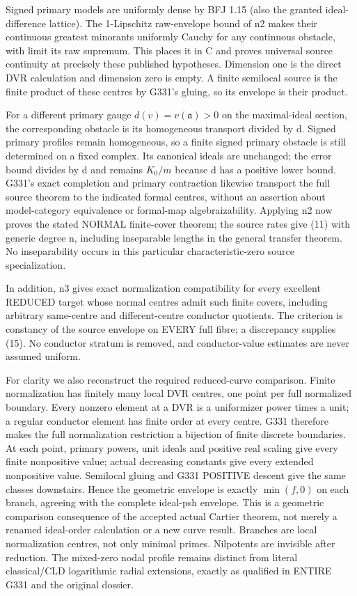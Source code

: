 Signed primary models are uniformly dense by BFJ 1.15 (also the granted
ideal-difference lattice). The 1-Lipschitz raw-envelope bound of n2
makes their continuous greatest minorants uniformly Cauchy for any
continuous obstacle, with limit its raw supremum. This places it in C
and proves universal source continuity at precisely these published
hypotheses. Dimension one is the direct DVR calculation and dimension
zero is empty. A finite semilocal source is the finite product of these
centres by G331's gluing, so its envelope is their product.

For a different primary gauge $d(v)=v(\mathfrak a)>0$ on the
maximal-ideal section, the corresponding obstacle is its homogeneous
transport divided by d. Signed primary profiles remain homogeneous,
so a finite signed primary obstacle is still determined on a fixed
complex. Its canonical ideals are unchanged; the error bound divides
by d and remains $K_0/m$ because d has a positive lower bound. G331's
exact completion and primary contraction likewise transport the full
source theorem to the indicated formal centres, without an assertion
about model-category equivalence or formal-map algebraizability.
Applying n2 now proves the stated NORMAL finite-cover theorem; the
source rates give (11) with generic degree n, including inseparable
lengths in the general transfer theorem. No inseparability occurs in
this particular characteristic-zero source specialization.

In addition, n3 gives exact normalization compatibility for every
excellent REDUCED target whose normal centres admit such finite covers,
including arbitrary same-centre and different-centre conductor quotients.
The criterion is constancy of the source envelope on EVERY full fibre;
a discrepancy supplies (15). No conductor stratum is removed, and
conductor-value estimates are never assumed uniform.

For clarity we also reconstruct the required reduced-curve comparison.
Finite normalization has finitely many local DVR centres, one point per
full normalized boundary. Every nonzero element at a DVR is a
uniformizer power times a unit; a regular conductor element has finite
order at every centre. G331 therefore makes the full normalization
restriction a bijection of finite discrete boundaries. At each point,
primary powers, unit ideals and positive real scaling give every finite
nonpositive value; actual decreasing constants give every extended
nonpositive value. Semilocal gluing and G331 POSITIVE descent give
the same classes downstairs. Hence the geometric envelope is exactly
$\min(f,0)$ on each branch, agreeing with the complete ideal-psh envelope.
This is a geometric comparison consequence of the accepted actual
Cartier theorem, not merely a renamed ideal-order calculation or a new
curve result. Branches are local normalization centres, not only minimal
primes. Nilpotents are invisible after reduction. The mixed-zero nodal
profile remains distinct from literal classical/CLD logarithmic radial
extensions, exactly as qualified in ENTIRE G331 and the original dossier.

